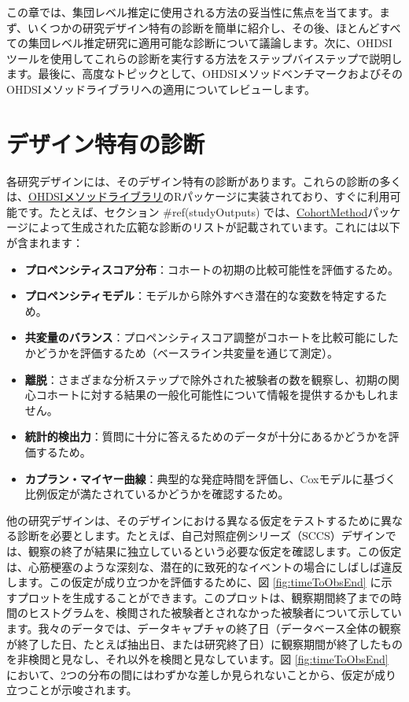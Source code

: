 \documentclass[
  11pt]{book}
\providecommand{\tightlist}{%
  \setlength{\itemsep}{0pt}\setlength{\parskip}{0pt}}
\theoremstyle{definition}
\theoremstyle{definition}
\theoremstyle{definition}
\theoremstyle{definition}
\theoremstyle{remark}
\begin{document}
この章では、集団レベル推定に使用される方法の妥当性に焦点を当てます。まず、いくつかの研究デザイン特有の診断を簡単に紹介し、その後、ほとんどすべての集団レベル推定研究に適用可能な診断について議論します。次に、OHDSIツールを使用してこれらの診断を実行する方法をステップバイステップで説明します。最後に、高度なトピックとして、OHDSIメソッドベンチマークおよびそのOHDSIメソッドライブラリへの適用についてレビューします。

\section{デザイン特有の診断}\label{ux30c7ux30b6ux30a4ux30f3ux7279ux6709ux306eux8a3aux65ad}


各研究デザインには、そのデザイン特有の診断があります。これらの診断の多くは、\href{https://ohdsi.github.io/MethodsLibrary/}{OHDSIメソッドライブラリ}のRパッケージに実装されており、すぐに利用可能です。たとえば、セクション \#ref(studyOutputs) では、\href{https://ohdsi.github.io/CohortMethod/}{CohortMethod}パッケージによって生成された広範な診断のリストが記載されています。これには以下が含まれます：

\begin{itemize}
\tightlist
\item
  \textbf{プロペンシティスコア分布}：コホートの初期の比較可能性を評価するため。
\item
  \textbf{プロペンシティモデル}：モデルから除外すべき潜在的な変数を特定するため。
\item
  \textbf{共変量のバランス}：プロペンシティスコア調整がコホートを比較可能にしたかどうかを評価するため（ベースライン共変量を通じて測定）。
\item
  \textbf{離脱}：さまざまな分析ステップで除外された被験者の数を観察し、初期の関心コホートに対する結果の一般化可能性について情報を提供するかもしれません。
\item
  \textbf{統計的検出力}：質問に十分に答えるためのデータが十分にあるかどうかを評価するため。
\item
  \textbf{カプラン・マイヤー曲線}：典型的な発症時間を評価し、Coxモデルに基づく比例仮定が満たされているかどうかを確認するため。
\end{itemize}

他の研究デザインは、そのデザインにおける異なる仮定をテストするために異なる診断を必要とします。たとえば、自己対照症例シリーズ（SCCS）デザインでは、観察の終了が結果に独立しているという必要な仮定を確認します。この仮定は、心筋梗塞のような深刻な、潜在的に致死的なイベントの場合にしばしば違反します。この仮定が成り立つかを評価するために、図 \ref{fig:timeToObsEnd} に示すプロットを生成することができます。このプロットは、観察期間終了までの時間のヒストグラムを、検閲された被験者とされなかった被験者について示しています。我々のデータでは、データキャプチャの終了日（データベース全体の観察が終了した日、たとえば抽出日、または研究終了日）に観察期間が終了したものを非検閲と見なし、それ以外を検閲と見なしています。図 \ref{fig:timeToObsEnd} において、2つの分布の間にはわずかな差しか見られないことから、仮定が成り立つことが示唆されます。
\end{document}
